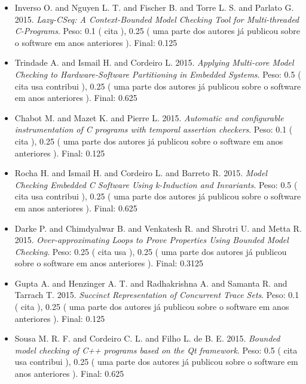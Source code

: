 \begin{itemize}
\item Inverso O. and Nguyen L. T. and Fischer B. and Torre L. S. and Parlato G.
      2015.
        \textit{ Lazy-CSeq: A Context-Bounded Model Checking Tool for Multi-threaded C-Programs}.
      Peso:
      0.1 (
          cita
      ),
      0.25 (
uma parte dos autores já publicou sobre o software em anos anteriores
      ).
      Final:
      0.125

\item Trindade A. and Ismail H. and Cordeiro L.
      2015.
        \textit{ Applying Multi-core Model Checking to Hardware-Software Partitioning in Embedded Systems}.
      Peso:
      0.5 (
          cita
          usa
          contribui
      ),
      0.25 (
uma parte dos autores já publicou sobre o software em anos anteriores
      ).
      Final:
      0.625

\item Chabot M. and Mazet K. and Pierre L.
      2015.
        \textit{ Automatic and configurable instrumentation of C programs with temporal assertion checkers}.
      Peso:
      0.1 (
          cita
      ),
      0.25 (
uma parte dos autores já publicou sobre o software em anos anteriores
      ).
      Final:
      0.125

\item Rocha H. and Ismail H. and Cordeiro L. and Barreto R.
      2015.
        \textit{ Model Checking Embedded C Software Using k-Induction and Invariants}.
      Peso:
      0.5 (
          cita
          usa
          contribui
      ),
      0.25 (
uma parte dos autores já publicou sobre o software em anos anteriores
      ).
      Final:
      0.625

\item Darke P. and Chimdyalwar B. and Venkatesh R. and Shrotri U. and Metta R.
      2015.
        \textit{ Over-approximating Loops to Prove Properties Using Bounded Model Checking}.
      Peso:
      0.25 (
          cita
          usa
      ),
      0.25 (
uma parte dos autores já publicou sobre o software em anos anteriores
      ).
      Final:
      0.3125

\item Gupta A. and Henzinger A. T. and Radhakrishna A. and Samanta R. and Tarrach T.
      2015.
        \textit{ Succinct Representation of Concurrent Trace Sets}.
      Peso:
      0.1 (
          cita
      ),
      0.25 (
uma parte dos autores já publicou sobre o software em anos anteriores
      ).
      Final:
      0.125

\item Sousa M. R. F. and Cordeiro C. L. and Filho L. de B. E.
      2015.
        \textit{ Bounded model checking of C++ programs based on the Qt framework}.
      Peso:
      0.5 (
          cita
          usa
          contribui
      ),
      0.25 (
uma parte dos autores já publicou sobre o software em anos anteriores
      ).
      Final:
      0.625


\end{itemize}
